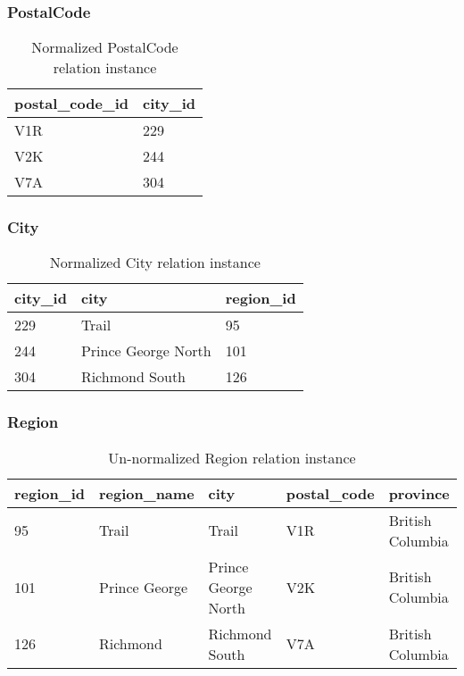 \subsubsection{PostalCode}
\begin{table}[H]
\centering
\begin{adjustbox}{width=0.25\textwidth,center=\textwidth}
\begin{tabular}{|l|l|} 
        \hline
        postal\_code\_id & city\_id \\ 
        \hline
        V1R & 229 \\
        V2K & 244 \\
        V7A & 304 \\
        \hline
\end{tabular}
\end{adjustbox}
\caption{Normalized PostalCode relation instance}
\end{table}

\subsubsection{City}
\begin{table}[H]
\centering
\begin{adjustbox}{width=0.35\textwidth,center=\textwidth}
\begin{tabular}{|l|l|l|} 
        \hline
        city\_id & city & region\_id \\ 
        \hline
        229 & Trail & 95 \\
        244 & Prince George North & 101 \\
        304 & Richmond South  & 126\\
        \hline
\end{tabular}
\end{adjustbox}
\caption{Normalized City relation instance}
\end{table}

\subsubsection{Region}
\begin{table}[H]
\centering
\begin{adjustbox}{width=0.45\textwidth,center=\textwidth}
\begin{tabular}{|l|l|l|l|l|} 
        \hline
        region\_id & region\_name & city & postal\_code & province \\ 
        \hline
        95 & Trail & Trail & V1R & British Columbia \\
        101 & Prince George & Prince George North & V2K & British Columbia \\
        126 & Richmond & Richmond South & V7A & British Columbia\\
        \hline
\end{tabular}
\end{adjustbox}
\caption{Un-normalized Region relation instance}
\end{table}


